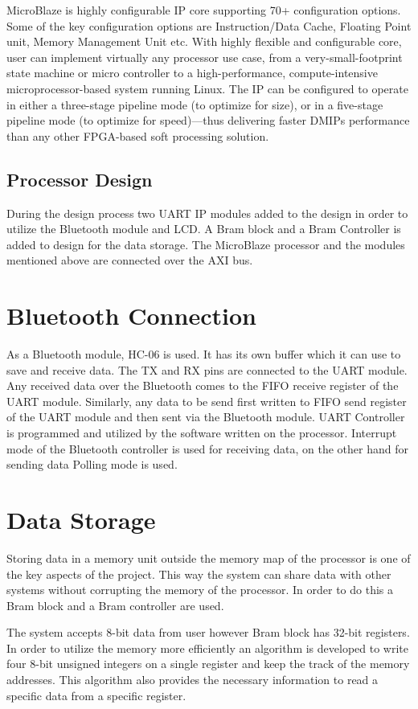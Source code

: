 MicroBlaze is highly configurable IP core supporting 70+ configuration options. Some of the key configuration options are Instruction/Data Cache, Floating Point unit, Memory Management Unit etc. With highly flexible and configurable core, user can implement virtually any processor use case, from a very-small-footprint state machine or micro controller to a high-performance, compute-intensive microprocessor-based system running Linux. The IP can be configured to operate in either a three-stage pipeline mode (to optimize for size), or in a five-stage pipeline mode (to optimize for speed)—thus delivering faster DMIPs performance than any other FPGA-based soft processing solution.

\subsection{Processor Design}
During the design process two UART IP modules added to the design in order to utilize the Bluetooth module and LCD. A Bram block and a Bram Controller is added to design for the data storage. The MicroBlaze processor and the modules mentioned above are connected over the AXI bus.

\section{Bluetooth Connection} 
As a Bluetooth module, HC-06 is used. It has its own buffer which it can use to save and receive data. The TX and RX pins are connected to the UART module. Any received data over the Bluetooth comes to the FIFO receive register of the UART module. Similarly, any data to be send first written to FIFO send register of the UART module and then sent via the Bluetooth module. UART Controller is programmed and utilized by the software written on the processor. Interrupt mode of the Bluetooth controller is used for receiving data, on the other hand for sending data Polling mode is used.

\section{Data Storage}
Storing data in a memory unit outside the memory map of the processor is one of the key aspects of the project. This way the system can share data with other systems without corrupting the memory of the processor. In order to do this a Bram block and a Bram controller are used.

The system accepts 8-bit data from user however Bram block has 32-bit registers. In order to utilize the memory more efficiently an algorithm is developed to write four 8-bit unsigned integers on a single register and keep the track of the memory addresses. This algorithm also provides the necessary information to read a specific data from a specific register.

